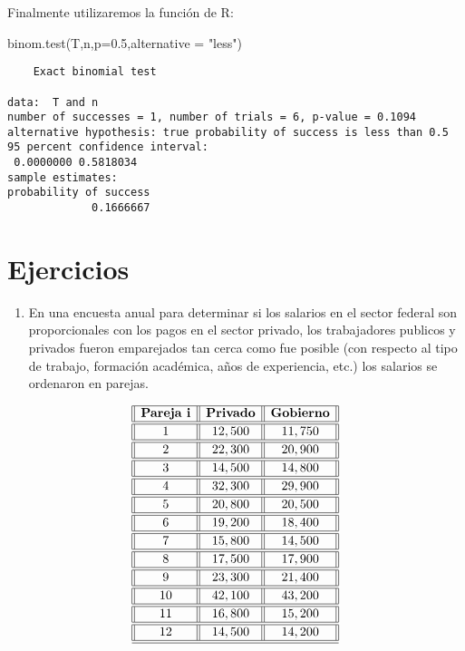 \documentclass[
  a4paper,
  oneside,
  openany]{book}
\newenvironment{Shaded}{\begin{snugshade}}{\end{snugshade}}
\newcommand{\AttributeTok}[1]{\textcolor[rgb]{0.77,0.63,0.00}{#1}}
\newcommand{\FloatTok}[1]{\textcolor[rgb]{0.00,0.00,0.81}{#1}}
\newcommand{\FunctionTok}[1]{\textcolor[rgb]{0.00,0.00,0.00}{#1}}
\newcommand{\NormalTok}[1]{#1}
\newcommand{\StringTok}[1]{\textcolor[rgb]{0.31,0.60,0.02}{#1}}
\providecommand{\tightlist}{%
  \setlength{\itemsep}{0pt}\setlength{\parskip}{0pt}}
\begin{document}
Finalmente utilizaremos la función de R:

\begin{Shaded}
\begin{Highlighting}[]
\FunctionTok{binom.test}\NormalTok{(T,n,}\AttributeTok{p=}\FloatTok{0.5}\NormalTok{,}\AttributeTok{alternative =} \StringTok{"less"}\NormalTok{)}
\end{Highlighting}
\end{Shaded}

\begin{verbatim}
    Exact binomial test

data:  T and n
number of successes = 1, number of trials = 6, p-value = 0.1094
alternative hypothesis: true probability of success is less than 0.5
95 percent confidence interval:
 0.0000000 0.5818034
sample estimates:
probability of success 
             0.1666667 
\end{verbatim}

\hypertarget{ejercicios-2}{%
\section{Ejercicios}\label{ejercicios-2}}

\begin{enumerate}
\def\labelenumi{\arabic{enumi}.}
\tightlist
\item
  En una encuesta anual para determinar si los salarios en el sector federal son proporcionales con los pagos en el sector privado, los trabajadores publicos y privados fueron emparejados tan cerca como fue posible (con respecto al tipo de trabajo, formación académica, años de experiencia, etc.) los salarios se ordenaron en parejas.
\end{enumerate}

\[
\begin{array}{||c| |c| |c||} 
\hline 
\textbf{Pareja i}  & \textbf{Privado} & \textbf{Gobierno} \\ 
\hline
\hline
1 &12,500& 11,750 \\
\hline
\hline
2& 22,300 &20,900 \\
\hline
\hline
3 &14,500 &14,800 \\
\hline
\hline
4 &32,300 &29,900 \\
\hline
\hline
5 &20,800 &20,500 \\
\hline
\hline
6 &19,200 &18,400 \\
\hline
\hline
7 &15,800 &14,500 \\
\hline
\hline
8 &17,500 &17,900 \\
\hline
\hline
9 &23,300 &21,400 \\
\hline
\hline
10 &42,100 &43,200 \\
\hline
\hline
11 &16,800 &15,200 \\
\hline
\hline
12& 14,500 &14,200 \\
\hline
\hline
\end{array}
\]
\end{document}
